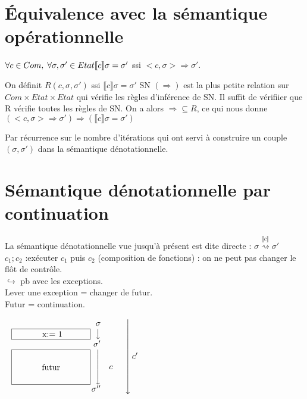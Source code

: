 \documentclass[10pt,a4paper]{article}
\newcommand{\semm}[1]{\llbracket #1 \rrbracket }
\begin{document}
\section{Équivalence avec la sémantique opérationnelle}
\begin{thm} $\forall c \in Com, \; \forall \sigma, \sigma' \in Etat\\
\semm{c} \sigma = \sigma'$ ssi $<c, \sigma> \Rightarrow \sigma'$.\\
\end{thm}

\begin{dem}[Winskel] \fbox{$\Leftarrow$} On définit $R(c, \sigma, \sigma')$ ssi $\semm{c} \sigma = \sigma'$
SN $(\Rightarrow)$ est la plus petite relation sur $Com \times Etat \times Etat$ qui vérifie les règles d'inférence de SN.
Il suffit de vérifiier que R vérifie toutes les règles de SN.
On a alors $\Rightarrow \subseteq R$, ce qui nous donne $(<c, \sigma> \Rightarrow \sigma') \Longrightarrow (\semm{c} \sigma = \sigma')$


\fbox{$\Rightarrow$} Par récurrence sur le nombre d'itérations qui ont servi à construire un couple $(\sigma, \sigma')$ dans la sémantique dénotationnelle.
\end{dem}


\section{Sémantique dénotationnelle par continuation}

La sémantique dénotationnelle vue jusqu'à présent est dite directe : $ \sigma \stackrel{\semm{c}}{\rightsquigarrow} \sigma'$\\
$c_1;c_2$ :\og  exécuter $c_1$ puis $c_2$ \fg (composition de fonctions) : on ne peut pas changer le flôt de contrôle.\\
$\hookrightarrow $ pb avec les exceptions.\\
Lever une exception = changer de futur.\\
Futur = continuation.

$\left.\begin{array}{r l l}
  \sigma & \\
 \left.\fbox{
 \begin{minipage}{3cm}
 \centering x:= 1
 \end{minipage}} \hspace{0.2cm}\right\downarrow& \\
 \sigma' & \\
\left.\fbox{
 \begin{minipage}{3cm}
\vspace{0.5cm}
\centering futur
\vspace{0.5cm} \quad
 \end{minipage}}\hspace{0.2cm}\right\downarrow &   c& \\
 \sigma'' & \\
\end{array}\right\downarrow c'$\qquad \qquad \qquad  \textcolor{red}{}
\end{document}
